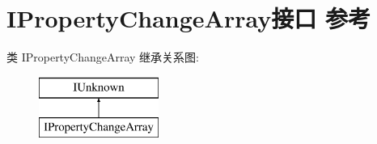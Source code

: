 \hypertarget{interface_i_property_change_array}{}\section{I\+Property\+Change\+Array接口 参考}
\label{interface_i_property_change_array}
类 I\+Property\+Change\+Array 继承关系图\+:\begin{figure}[H]
\begin{center}
\leavevmode
\includegraphics[height=2.000000cm]{interface_i_property_change_array}
\end{center}
\end{figure}
